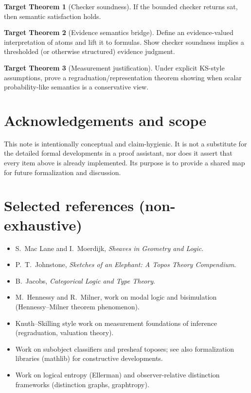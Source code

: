 \documentclass[11pt]{article}
\theoremstyle{definition}
\newtheorem{goal}{Target Theorem}
\begin{document}
\begin{goal}[Checker soundness]
If the bounded checker returns \textsf{sat}, then semantic satisfaction holds.
\end{goal}

\begin{goal}[Evidence semantics bridge]
Define an evidence-valued interpretation of atoms and lift it to formulas.
Show checker soundness implies a thresholded (or otherwise structured) evidence judgment.
\end{goal}

\begin{goal}[Measurement justification]
Under explicit KS-style assumptions, prove a regraduation/representation theorem
showing when scalar probability-like semantics is a conservative view.
\end{goal}

\section*{Acknowledgements and scope}
This note is intentionally conceptual and claim-hygienic.
It is not a substitute for the detailed formal developments in a proof assistant,
nor does it assert that every item above is already implemented.
Its purpose is to provide a shared map for future formalization and discussion.

\section*{Selected references (non-exhaustive)}
\begin{itemize}[leftmargin=1.5em]
\item S.~Mac Lane and I.~Moerdijk, \emph{Sheaves in Geometry and Logic}.
\item P.~T.~Johnstone, \emph{Sketches of an Elephant: A Topos Theory Compendium}.
\item B.~Jacobs, \emph{Categorical Logic and Type Theory}.
\item M.~Hennessy and R.~Milner, work on modal logic and bisimulation (Hennessy--Milner theorem phenomenon).
\item Knuth--Skilling style work on measurement foundations of inference (regraduation, valuation theory).
\item Work on subobject classifiers and presheaf toposes; see also formalization libraries (mathlib) for constructive developments.
\item Work on logical entropy (Ellerman) and observer-relative distinction frameworks (distinction graphs, graphtropy).
\end{itemize}
\end{document}
